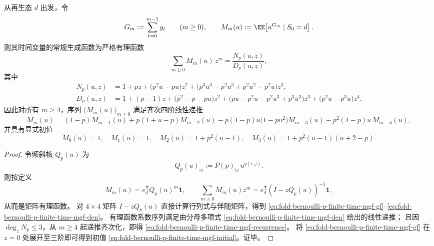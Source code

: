 \begin{theorem}[有限时刻异常计数的有理型时间生成函数与四阶递推]\label{thm:fold-bernoulli-p-finite-time-mismatch-rational-recurrence}
从再生态 \(d\) 出发，令
\[
G_m:=\sum_{t=0}^{m-1} g_t \qquad (m\ge 0),
\qquad
M_m(u):=\EE\!\left[u^{G_m}\mid S_0=d\right].
\]
则其时间变量的常规生成函数为严格有理函数
\begin{equation}\label{eq:fold-bernoulli-p-finite-time-mgf-gf}
\sum_{m\ge0} M_m(u)\,z^m=\frac{N_p(u,z)}{D_p(u,z)},
\end{equation}
其中
\begin{align}
N_p(u,z)&=
1+pz+\bigl(p^2u-pu\bigr)z^2+\bigl(p^3u^3-p^2u^3+p^2u^2-p^2u\bigr)z^3,\label{eq:fold-bernoulli-p-finite-time-mgf-num}\\[2mm]
D_p(u,z)&=
1+(p-1)z+\bigl(p^2-p-pu\bigr)z^2+\bigl(pu-p^2u-p^2u^3+p^3u^3\bigr)z^3+\bigl(p^2u-p^3u\bigr)z^4.\label{eq:fold-bernoulli-p-finite-time-mgf-den}
\end{align}
因此对所有 \(m\ge4\)，序列 \(\bigl(M_m(u)\bigr)_{m\ge0}\) 满足齐次四阶线性递推
\begin{equation}\label{eq:fold-bernoulli-p-finite-time-mgf-recurrence}
M_m(u)=(1-p)M_{m-1}(u)+p(1+u-p)M_{m-2}(u)-p(1-p)u\bigl(1-pu^2\bigr)M_{m-3}(u)-p^2(1-p)u\,M_{m-4}(u),
\end{equation}
并具有显式初值
\begin{equation}\label{eq:fold-bernoulli-p-finite-time-mgf-initial}
M_0(u)=1,\quad M_1(u)=1,\quad M_2(u)=1+p^2(u-1),\quad M_3(u)=1+p^2(u-1)(u+2-p).
\end{equation}
\end{theorem}
\begin{proof}
令倾斜核 \(Q_p(u)\) 为
\[
Q_p(u)_{ij}:=P(p)_{ij}\,u^{g(i,j)} .
\]
则按定义
\[
M_m(u)=e_d^{\mathsf T}Q_p(u)^{m}\mathbf 1,
\qquad
\sum_{m\ge0}M_m(u)z^m=e_d^{\mathsf T}(I-zQ_p(u))^{-1}\mathbf 1,
\]
从而是矩阵有理函数。
对 \(4\times4\) 矩阵 \(I-zQ_p(u)\) 直接计算行列式与伴随矩阵，得到
\eqref{eq:fold-bernoulli-p-finite-time-mgf-gf}--\eqref{eq:fold-bernoulli-p-finite-time-mgf-den}。
有理函数系数序列满足由分母多项式 \eqref{eq:fold-bernoulli-p-finite-time-mgf-den} 给出的线性递推；
且因 \(\deg_z N_p\le3\)，从 \(m\ge4\) 起递推齐次化，即得 \eqref{eq:fold-bernoulli-p-finite-time-mgf-recurrence}。
将 \eqref{eq:fold-bernoulli-p-finite-time-mgf-gf} 在 \(z=0\) 处展开至三阶即可得到初值 \eqref{eq:fold-bernoulli-p-finite-time-mgf-initial}。证毕。
\end{proof}

